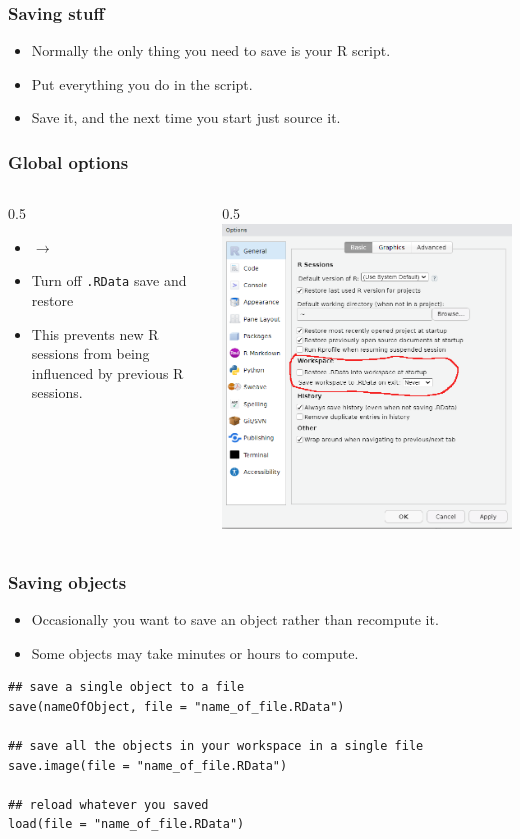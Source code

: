 \documentclass{beamer}
\newcommand{\lsting}[1]{\begin{lstlisting}[basicstyle=#1]}
\newcommand{\bi}{\begin{itemize}}
\newcommand{\li}{\item}
\newcommand{\ei}{\end{itemize}}
\newcommand{\arrow}{\ensuremath{\rightarrow}}
\newcommand{\bfr}[1]{\begin{frame}[fragile]\frametitle{{ #1 }}}
\newcommand{\cola}{\begin{columns}\begin{column}{0.5\textwidth}}
\newcommand{\colb}{\end{column}\begin{column}{0.5\textwidth}}
\newcommand{\colc}{\end{column}\end{columns}}
\begin{document}
\bfr{Saving stuff}
\bi
\li Normally the only thing you need to save is your R script.
\li Put everything you do in the script.
\li Save it, and the next time you start just source it.
\ei

\end{frame}


\bfr{Global options}
\cola
\begin{itemize}
\item {}\arrow{}

\item
Turn off \verb|.RData| save and restore
\item
This prevents new R sessions from being influenced
by previous R sessions.
\end{itemize}

\colb
\includegraphics[width=\textwidth]{globaloptions}
\colc
\end{frame}

\bfr{Saving objects}
\bi
\li Occasionally you want to save an object rather than recompute it.
\li Some objects may take minutes or hours to compute.
\ei
\lsting{\scriptsize}
## save a single object to a file
save(nameOfObject, file = "name_of_file.RData")

## save all the objects in your workspace in a single file
save.image(file = "name_of_file.RData")

## reload whatever you saved
load(file = "name_of_file.RData")
\end{lstlisting}
\end{frame}
\end{document}
